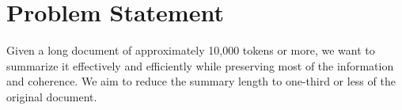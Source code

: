 \section{Problem Statement}
\label{sec:problem}

Given a long document of approximately 10,000 tokens or more, we want to summarize it effectively and efficiently while preserving most of the information and coherence.
We aim to reduce the summary length to one-third or less of the original document.
